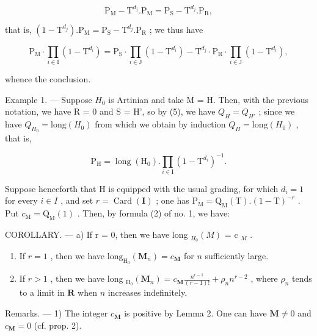 \[
\mathrm{P} _ {\mathrm{M}} - \mathrm{T} ^ {d _ {j}}. \mathrm{P} _ {\mathrm{M}} = \mathrm{P} _ {\mathrm{S}} - \mathrm{T} ^ {d _ {j}}. \mathrm{P} _ {\mathrm{R}},
\]

that is, \((1 - \mathrm{T}^{d_j}).\mathrm{P}_{\mathrm{M}} = \mathrm{P}_{\mathrm{S}} - \mathrm{T}^{d_j}.\mathrm{P}_{\mathrm{R}}\) ; we thus have

\[
\mathrm{P} _ {\mathrm{M}} \cdot \prod_ {i \in \mathrm{I}} (1 - \mathrm{T} ^ {d _ {i}}) = \mathrm{P} _ {\mathrm{S}} \cdot \prod_ {i \in \mathrm{J}} (1 - \mathrm{T} ^ {d _ {i}}) - \mathrm{T} ^ {d _ {j}} \cdot \mathrm{P} _ {\mathrm{R}} \cdot \prod_ {i \in \mathrm{J}} (1 - \mathrm{T} ^ {d _ {i}}),\tag{5}
\]

whence the conclusion.

Example 1. --- Suppose \(H_{0}\) is Artinian and take M = H. Then, with the previous notation, we have R = 0 and S = H', so by (5), we have \(Q_{H} = Q_{H'}\) ; since we have \(Q_{H_{0}} = \text{long}(H_{0})\) from which we obtain by induction \(Q_{H} = \text{long}(H_{0})\) , that is,

\[
\mathrm{P} _ {\mathrm{H}} = \operatorname{long} (\mathrm{H} _ {0}). \prod_ {i \in \mathrm{I}} (1 - \mathrm{T} ^ {d _ {i}}) ^ {- 1}.\tag{6}
\]

Suppose henceforth that H is equipped with the usual grading, for which \(d_{i}=1\) for every \(i\in I\) , and set \(r=\operatorname{Card}(\mathbf{I})\) ; one has \(\mathrm{P}_{\mathrm{M}}=\mathrm{Q}_{\mathrm{M}}(\mathrm{T}).(1-\mathrm{T})^{-r}\) . Put \(c_{\mathrm{M}}=\mathrm{Q}_{\mathrm{M}}(1)\) . Then, by formula (2) of no. 1, we have:

COROLLARY. --- a) If r = 0, then we have long \(_{H_{0}}(M)\) = c \(_{M}\) .

\begin{enumerate}
\def\labelenumi{\alph{enumi})}
\setcounter{enumi}{1}
\item
  If \(r = 1\) , then we have \(\mathrm{long}_{\mathrm{H}_0}(\mathbf{M}_n) = c_{\mathbf{M}}\) for \(n\) sufficiently large.
\item
  If \(r > 1\) , then we have long \(_{\mathrm{H}_0}(\mathbf{M}_n) = c_{\mathbf{M}} \frac{n^{r-1}}{(r - 1)!} + \rho_n n^{r-2}\) , where \(\rho_n\) tends to a limit in \(\mathbf{R}\) when \(n\) increases indefinitely.
\end{enumerate}

Remarks. --- 1) The integer \(c_{\mathbf{M}}\) is positive by Lemma 2. One can have \(\mathbf{M} \neq 0\) and \(c_{\mathbf{M}} = 0\) (cf. prop. 2).


